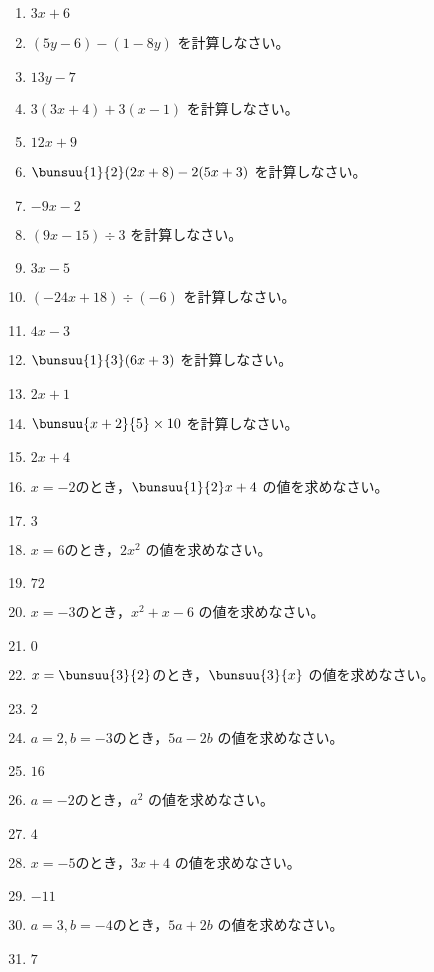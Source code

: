 \documentclass[uplatex,a4j,11pt]{jsreport}
\begin{document}
\begin{multicols}{2}
\begin{enumerate}
    \item $3x+6$
    \item $(5y-6)-(1-8y)$ を計算しなさい。%
    \item $13y-7$
    \item $3(3x+4)+3(x-1)$ を計算しなさい。%
    \item $12x+9$
    \item $\bunsuu{1}{2}(2x+8)-2(5x+3)$ を計算しなさい。%
    \item $-9x-2$
    \item $(9x-15)\div 3$ を計算しなさい。%
    \item $3x-5$
    \item $(-24x+18)\div (-6)$ を計算しなさい。%
    \item $4x-3$
    \item $\bunsuu{1}{3}(6x+3)$ を計算しなさい。%
    \item $2x+1$
    \item $\bunsuu{x+2}{5}\times 10$ を計算しなさい。%
    \item $2x+4$
    \item $x=-2$のとき，$\bunsuu{1}{2}x+4$ の値を求めなさい。%
    \item $3$
    \item $x=6$のとき，$2x^2$ の値を求めなさい。%
    \item $72$
    \item $x=-3$のとき，$x^2+x-6$ の値を求めなさい。%
    \item $0$
    \item $x=\bunsuu{3}{2}$のとき，$\bunsuu{3}{x}$ の値を求めなさい。%
    \item $2$
    \item $a=2,b=-3$のとき，$5a-2b$ の値を求めなさい。%
    \item $16$
    \item $a=-2$のとき，$a^2$ の値を求めなさい。%
    \item $4$
    \item $x=-5$のとき，$3x+4$ の値を求めなさい。%
    \item $-11$
    \item $a=3, b=-4$のとき，$5a+2b$ の値を求めなさい。%
    \item $7$

\end{enumerate}
\end{multicols}
\end{document}
